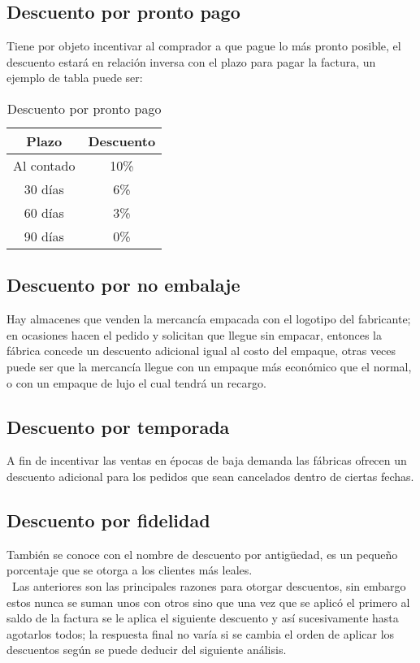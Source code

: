 \subsection{Descuento por pronto pago}
Tiene por objeto incentivar al comprador a que pague lo más pronto posible, el descuento estará en relación inversa con el plazo para pagar la factura, un ejemplo de tabla puede ser:

\begin{table}[H]
\fontsize{11}{9}\selectfont
\centering
\label{Descuento por pronto pago}
\begin{tabular}{|c|l|c|l|}
\hline
\multicolumn{2}{|c|}{Plazo}      & \multicolumn{2}{c|}{Descuento} \\ \hline
\multicolumn{2}{|c|}{Al contado} & \multicolumn{2}{c|}{10\%}      \\ 
\multicolumn{2}{|c|}{30 días}    & \multicolumn{2}{c|}{6\%}       \\ 
\multicolumn{2}{|c|}{60 días}    & \multicolumn{2}{c|}{3\%}       \\ 
\multicolumn{2}{|c|}{90 días}    & \multicolumn{2}{c|}{0\%}       \\ \hline
\end{tabular}
\caption{Descuento por pronto pago}
\end{table}

\subsection{Descuento por no embalaje}
Hay almacenes que venden la mercancía empacada con el logotipo del fabricante; en ocasiones hacen el pedido y solicitan que llegue sin empacar, entonces la fábrica concede un descuento adicional igual al costo del empaque, otras veces puede ser que la mercancía llegue con un empaque más económico que el normal, o con un empaque de lujo el cual tendrá un recargo.

\subsection{Descuento por temporada}
A fin de incentivar las ventas en épocas de baja demanda las fábricas ofrecen un descuento adicional para los pedidos que sean cancelados dentro de ciertas fechas. 

\subsection{Descuento por fidelidad}
También se conoce con el nombre de descuento por antigüedad, es un pequeño porcentaje que se otorga a los clientes más leales.
\\\
Las anteriores son las principales razones para otorgar descuentos, sin embargo estos nunca se suman unos con otros sino que una vez que se aplicó el primero al saldo de la factura se le aplica el siguiente descuento y así sucesivamente hasta agotarlos todos; la respuesta final no varía si se cambia el orden de aplicar los descuentos según se puede deducir del siguiente análisis.

